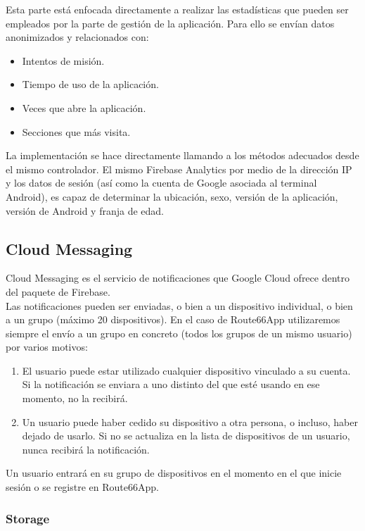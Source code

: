 \documentclass[twoside]{report}
\begin{document}
Esta parte está enfocada directamente a realizar las estadísticas que pueden ser empleados por la parte de gestión de la aplicación. Para ello se envían datos anonimizados y relacionados con:

\begin{itemize}
\item Intentos de misión.
\item Tiempo de uso de la aplicación.
\item Veces que abre la aplicación.
\item Secciones que más visita.
\end{itemize}

La implementación se hace directamente llamando a los métodos adecuados desde el mismo controlador. El mismo Firebase Analytics por medio de la dirección IP y los datos de sesión (así como la cuenta de Google asociada al terminal Android), es capaz de determinar la ubicación, sexo, versión de la aplicación, versión de Android y franja de edad.

\subsection{Cloud Messaging}

Cloud Messaging es el servicio de notificaciones que Google Cloud ofrece dentro del paquete de Firebase. \\

Las notificaciones pueden ser enviadas, o bien a un dispositivo individual, o bien a un grupo (máximo 20 dispositivos). En el caso de Route66App utilizaremos siempre el envío a un grupo en concreto (todos los grupos de un mismo usuario) por varios motivos:

\begin{enumerate}
\item El usuario puede estar utilizado cualquier dispositivo vinculado a su cuenta. Si la notificación se enviara a uno distinto del que esté usando en ese momento, no la recibirá.

\item Un usuario puede haber cedido su dispositivo a otra persona, o incluso, haber dejado de usarlo. Si no se actualiza en la lista de dispositivos de un usuario, nunca recibirá la notificación.
\end{enumerate}

Un usuario entrará en su grupo de dispositivos en el momento en el que inicie sesión o se registre en Route66App.

\subsubsection{Storage}
\end{document}
